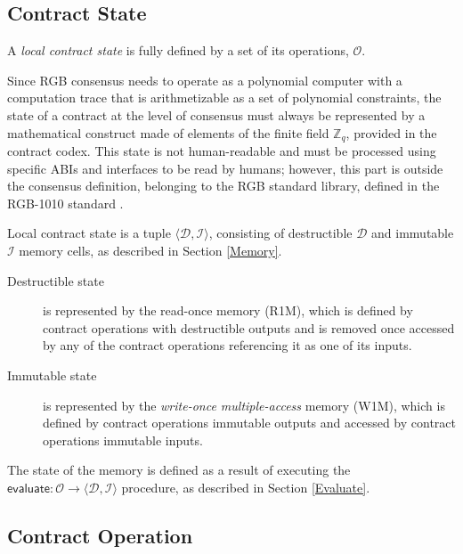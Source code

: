 \documentclass[9pt,oneside]{amsart}
\begin{document}
\begin{multicols}{2}


\subsection{Contract State}

A \emph{local contract state} is fully defined by a set of its operations, $\mathcal{O}$.

Since RGB consensus needs to operate as a polynomial computer with a computation trace that is
arithmetizable as a set of polynomial constraints, the state of a contract at the level of
consensus must always be represented by a mathematical construct
made of elements of the finite field $\mathbb{Z}_q$, provided in the contract codex.
This state is not human-readable and must be processed using specific ABIs and interfaces
to be read by humans; however, this part is outside the consensus definition, belonging
to the RGB standard library, defined in the RGB-1010 standard \cite{RGB1010}.

Local contract state is a tuple $\langle \mathcal{D}, \mathcal{I} \rangle$,
consisting of destructible $\mathcal{D}$ and immutable $\mathcal{I}$ memory cells,
as described in Section \ref{Memory}.

\begin{description}
\item[Destructible state] is represented by the \gls{read-once memory} (R1M),
  which is defined by contract operations with destructible outputs
  and is removed once accessed by any of the contract operations referencing it as one of its inputs.

\item[Immutable state] is represented by the \emph{write-once multiple-access} memory (W1M),
  which is defined by contract operations immutable outputs
  and accessed by contract operations immutable inputs.
\end{description}

The state of the memory is defined as a result of executing the
$\mathsf{evaluate}: \mathcal{O} \rightarrow \langle \mathcal{D}, \mathcal{I} \rangle$ procedure,
as described in Section \ref{Evaluate}.

\subsection{Contract Operation}\label{Operation}


\end{multicols}
\end{document}
